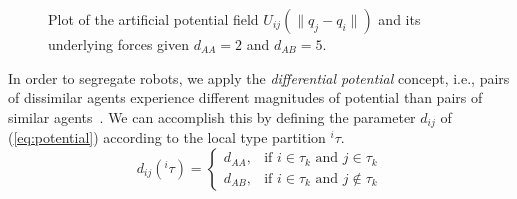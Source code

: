 \documentclass[letterpaper, 10 pt, conference]{ieeeconf}  %
\newcommand{\norm}[1]{\lVert#1\rVert}
\begin{document}
\begin{figure}[thpb]
  \centering
  \caption{Plot of the artificial potential field $U_{ij}(\norm{q_j -
      q_i})$ and its underlying forces given $d_{AA}=2$ and $d_{AB}=5$.}
  \label{fig:plots}
\end{figure}

In order to segregate robots, we apply the \textit{differential
  potential} concept, i.e., pairs of dissimilar agents experience
different magnitudes of potential than pairs of similar
agents~\cite{Kumar:10}. We can accomplish this by defining the
parameter $d_{ij}$ of (\ref{eq:potential}) according to the local type
partition $^i\tau$.
\begin{equation}
  \label{eq:dij}
  d_{ij}(^i\tau) =
  \begin{cases}
    d_{AA},& \text{if } i \in \tau_k \text{ and } j \in \tau_k \\
    d_{AB},& \text{if } i \in \tau_k \text{ and } j \not\in \tau_k
  \end{cases}
\end{equation}
\end{document}
